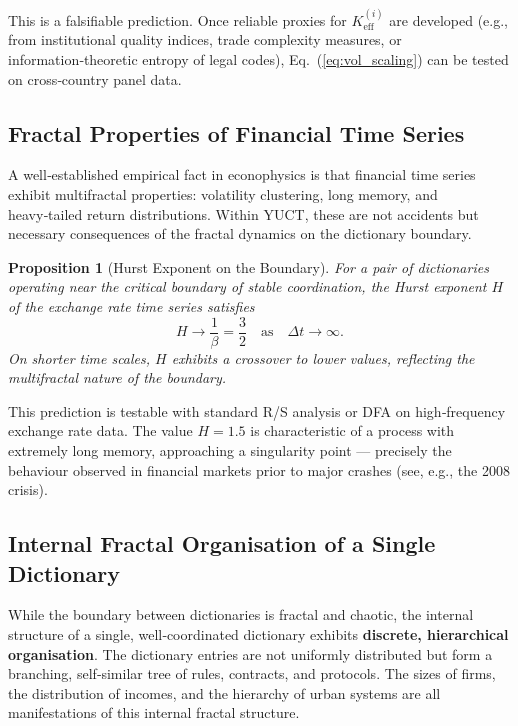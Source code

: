 \documentclass[12pt,a4paper]{article}
\newtheorem{proposition}[theorem]{Proposition}
\theoremstyle{remark}
\begin{document}
	This is a falsifiable prediction. Once reliable proxies for \(K_{\mathrm{eff}}^{(i)}\) are developed (e.g., from institutional quality indices, trade complexity measures, or information‑theoretic entropy of legal codes), Eq.~(\ref{eq:vol_scaling}) can be tested on cross‑country panel data.
	
	\subsection{Fractal Properties of Financial Time Series}
	
	A well‑established empirical fact in econophysics is that financial time series exhibit multifractal properties: volatility clustering, long memory, and heavy‑tailed return distributions. Within YUCT, these are not accidents but necessary consequences of the fractal dynamics on the dictionary boundary.
	
	\begin{proposition}[Hurst Exponent on the Boundary]
		For a pair of dictionaries operating near the critical boundary of stable coordination, the Hurst exponent \(H\) of the exchange rate time series satisfies
		\begin{equation}
			H \to \frac{1}{\beta} = \frac{3}{2} \quad \text{as} \quad \Delta t \to \infty.
			\label{eq:hurst}
		\end{equation}
		On shorter time scales, \(H\) exhibits a crossover to lower values, reflecting the multifractal nature of the boundary.
	\end{proposition}
	
	This prediction is testable with standard R/S analysis or DFA on high‑frequency exchange rate data. The value \(H = 1.5\) is characteristic of a process with extremely long memory, approaching a singularity point — precisely the behaviour observed in financial markets prior to major crashes (see, e.g., the 2008 crisis).
	
	\subsection{Internal Fractal Organisation of a Single Dictionary}
	
	While the boundary between dictionaries is fractal and chaotic, the internal structure of a single, well‑coordinated dictionary exhibits \textbf{discrete, hierarchical organisation}. The dictionary entries are not uniformly distributed but form a branching, self‑similar tree of rules, contracts, and protocols. The sizes of firms, the distribution of incomes, and the hierarchy of urban systems are all manifestations of this internal fractal structure.
	
\end{document}
